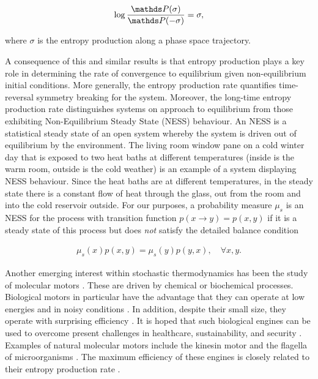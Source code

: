 \begin{align}
\log \frac{\bP(\mathcal{\sigma})}{\bP(-\mathcal{\sigma})} = \mathcal{\sigma},
\end{align}

where $\sigma$ is the entropy production along a phase space trajectory. 

A consequence of this and similar results is that entropy production plays a key role in determining the rate of convergence to equilibrium given non-equilibrium initial conditions. More generally, the entropy production rate quantifies time-reversal symmetry breaking for the system. Moreover, the long-time entropy production rate distinguishes systems on approach to equilibrium from those exhibiting Non-Equilibrium Steady State (NESS) behaviour. An NESS is a statistical steady state of an open system whereby the system is driven out of equilibrium by the environment. The living room window pane on a cold winter day that is exposed to two heat baths at different temperatures (inside is the warm room, outside is the cold weather) is an example of a system displaying NESS behaviour. Since the heat baths are at different temperatures, in the steady state there is a constant flow of heat through the glass, out from the room and into the cold reservoir outside. For our purposes, a probability measure $\mu_s$ is an NESS for the process with transition function $p(x\rightarrow y) = p(x,y)$ if it is a steady state of this process but does \emph{not} satisfy the detailed balance condition 

\begin{align}
\mu_s(x)p(x,y) = \mu_s(y)p(y,x), \quad \forall x,y.
\end{align}

Another emerging interest within stochastic thermodynamics has been the study of molecular motors \cite{parrondo2002energetics}. These are driven by chemical or biochemical processes. Biological motors in particular have the advantage that they can operate at low energies and in noisy conditions \cite{faisal2008noise,eldar2010functional}. In addition, despite their small size, they operate with surprising efficiency \cite{abdelmohsen2014micro} . It is hoped that such biological engines can be used to overcome present challenges in healthcare, sustainability, and security \cite{bechinger2016active}. Examples of natural molecular motors include the kinesin motor\cite{bustamante2005nonequilibrium} and the flagella of microorganisms \cite{poon2013clarkia}. The maximum efficiency of these engines is closely related to their entropy production rate \cite{pietzonka2016universal}.

